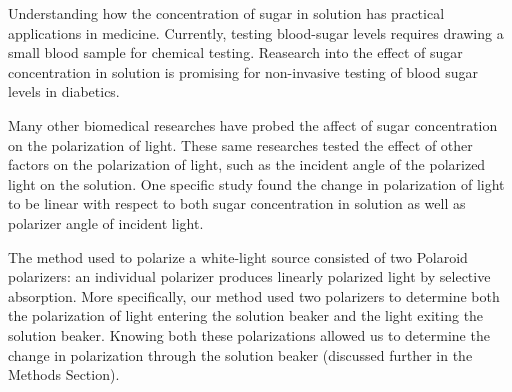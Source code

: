 
Understanding how the concentration of sugar in solution has practical applications in medicine. Currently, testing blood-sugar levels requires drawing a small blood sample for chemical testing. Reasearch into the effect of sugar concentration in solution is promising for non-invasive testing of blood sugar levels in diabetics.

Many other biomedical researches have probed the affect of sugar concentration on the polarization of light. These same researches tested the effect of other factors on the polarization of light, such as the incident angle of the polarized light on the solution. One specific study found the change in polarization of light to be linear with respect to both sugar concentration in solution as well as polarizer angle of incident light\cite{Firsdausi2018}.

The method used to polarize a white-light source consisted of two Polaroid polarizers: an individual polarizer produces linearly polarized light by selective absorption. More specifically, our method used two polarizers to determine both the polarization of light entering the solution beaker and the light exiting the solution beaker. Knowing both these polarizations allowed us to determine the change in polarization through the solution beaker (discussed further in the Methods Section).

